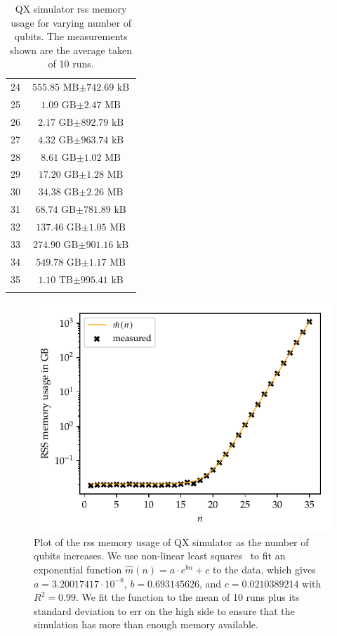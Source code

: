 \begin{table}[H]
\begin{tabular}{cc}
        24 & $\text{555.85 MB} \pm \text{742.69 kB}$ \\
        25 & $\text{1.09 GB} \pm \text{2.47 MB}$ \\
        26 & $\text{2.17 GB} \pm \text{892.79 kB}$ \\
        27 & $\text{4.32 GB} \pm \text{963.74 kB}$ \\
        28 & $\text{8.61 GB} \pm \text{1.02 MB}$ \\
        29 & $\text{17.20 GB} \pm \text{1.28 MB}$ \\
        30 & $\text{34.38 GB} \pm \text{2.26 MB}$ \\
        31 & $\text{68.74 GB} \pm \text{781.89 kB}$ \\
        32 & $\text{137.46 GB} \pm \text{1.05 MB}$ \\
        33 & $\text{274.90 GB} \pm \text{901.16 kB}$ \\
        34 & $\text{549.78 GB} \pm \text{1.17 MB}$ \\
        35 & $\text{1.10 TB} \pm \text{995.41 kB}$ \\
        \phantom{36} & \\
    \end{tabular}
    \caption[QX simulator \gls{rss} memory usage for varying number of qubits.]{
        QX simulator \gls{rss} memory usage for varying number of qubits.
        The measurements shown are the average taken of 10 runs.
    }
    \label{table:qx-memory-usage}
\end{table}

\begin{figure}[ht]
    \centering
    \includegraphics[width=0.765\linewidth]{figures/qx_memory_plot.pdf}
    
    \caption[Plot of the \gls{rss} memory usage of QX simulator as the number of qubits increases.]{
        Plot of the \gls{rss} memory usage of QX simulator as the number of qubits increases.
        We use non-linear least squares~\cite{branch1999subspace} to fit an exponential function $\hat{m}(n) = a \cdot e^{bn} + c$ to the data, which gives $a = 3.20017417 \cdot 10^{-8}$, $b = 0.693145626$, and $c = 0.0210389214$ with $R^2 = 0.99$.
        We fit the function to the mean of 10 runs plus its standard deviation to err on the high side to ensure that the simulation has more than enough memory available.
    }
    \label{fig:qx-memory-plot}
\end{figure}


